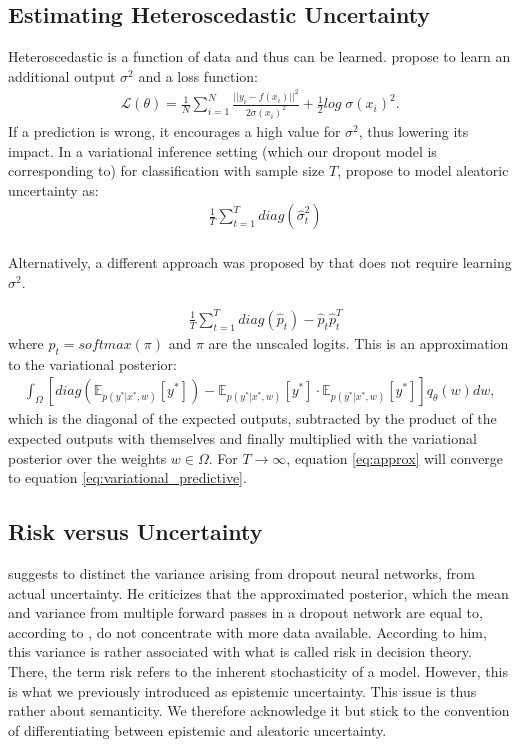 \documentclass[a4paper,cleardoubleempty,BCOR1cm, 11pt]{report}
\begin{document}
\subsection{Estimating Heteroscedastic Uncertainty}
Heteroscedastic is a function of data and thus can be learned. \citet{kendall2017uncertainties} propose to learn an additional output $\sigma^2$ and a loss function:
\begin{align}
\mathcal{L}(\theta) = \frac{1}{N}\sum_{i=1}^{N} \frac{||y_i-f(x_i)||^2}{2\sigma(x_i)^2} + \frac{1}{2}log\;\sigma(x_i)^2.
\end{align}
If a prediction is wrong, it encourages a high value for $\sigma^2$, thus lowering its impact. In a variational inference setting (which our dropout model is corresponding to) for classification with sample size $T$, \citet{kendall2017uncertainties} propose to model aleatoric uncertainty as:
\begin{align}
&\frac{1}{T}\sum_{t=1}^{T}diag(\hat{\sigma}_t^2)
\end{align}
\\
Alternatively, a different approach was proposed by \citet{kwon2020uncertainty} that does not require learning $\sigma^2$. 

\begin{align}
\label{eq:approx}
&\frac{1}{T}\sum_{t=1}^{T}diag(\hat{p}_t) - \hat{p}_t\hat{p}_t^T
\end{align}
where $\hat{p}_t = softmax(\pi)$  and $\pi$ are the unscaled logits.
This is an approximation to the variational posterior:
\begin{align}
\label{eq:variational_predictive}
\int_{\Omega}\left[ diag (\mathbb{E}_{p(y^*|x^*,w)}[y^*]) -\mathbb{E}_{p(y^*|x^*,w)}[y^*] \cdot \mathbb{E}_{p(y^*|x^*,w)}[y^*] \right]q_{\theta}(w)dw,
\end{align}
which is the diagonal of the expected outputs, subtracted by the product of the expected outputs with themselves and finally multiplied with the variational posterior over the weights $w\in \Omega$.  For $T\rightarrow \infty$, equation \ref{eq:approx} will converge to equation \ref{eq:variational_predictive}.


\subsection{Risk versus Uncertainty}
\citet{osband2016risk} suggests to distinct the variance arising from dropout neural networks, from actual uncertainty. He criticizes that the approximated posterior, which the mean and variance from multiple forward passes in a dropout network are equal to, according to \citet{gal2016dropout}, do not concentrate with more data available. According to him, this variance is rather associated with what is called risk in decision theory. There, the term risk refers to the inherent stochasticity of a model. However, this is what we previously introduced as epistemic uncertainty. This issue is thus rather about semanticity. We therefore acknowledge it but stick to the convention of differentiating between epistemic and aleatoric uncertainty.
\end{document}

